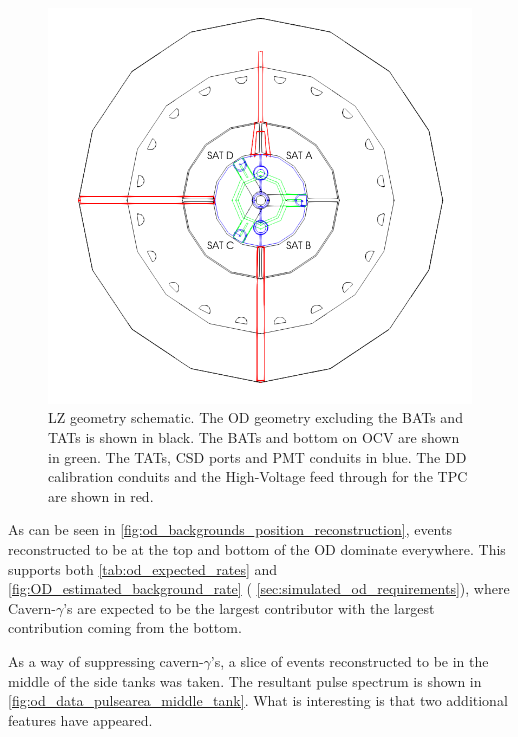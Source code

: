 \begin{figure}[!htbp]
\includegraphics[width=\textwidth]{Figures/Geometry/geometry_with_conduits.png}
\centering
\caption{LZ geometry schematic. The OD geometry excluding the BATs and TATs is shown in black. The BATs and bottom on OCV are shown in green. The TATs, CSD ports and PMT conduits in blue. The DD calibration conduits and the High-Voltage feed through for the TPC are shown in red.}
\label{fig:OD_conduit_geometry}
\end{figure}



\par
As can be seen in \autoref{fig:od_backgrounds_position_reconstruction}, events reconstructed to be at the top and bottom of the OD dominate everywhere.
This supports both \autoref{tab:od_expected_rates} and \autoref{fig:OD_estimated_background_rate} ( \autoref{sec:simulated_od_requirements}), where Cavern-$\gamma$'s are expected to be the largest contributor with the largest contribution coming from the bottom.


\par
As a way of suppressing cavern-$\gamma$'s, a slice of events reconstructed to be in the middle of the side tanks was taken.
The resultant pulse spectrum is shown in  \autoref{fig:od_data_pulsearea_middle_tank}.
What is interesting is that two additional features have appeared.


